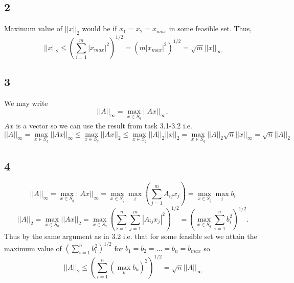 \documentclass{article}
\begin{document}
\subsection*{2}
Maximum value of $||x||_2$ would be if $x_1 = x_2 = x_{max}$ in some feasible set. Thus,
\begin{equation}
    ||x||_2 \leq \left( \sum_{i=1}^m |x_{max}|^2 
                 \right)^{1/2} =
                 \left( m |x_{max}|^2 
                 \right)^{1/2} = 
                 \sqrt{m} ||x||_\infty
\end{equation}
\subsection*{3}
We may write
\begin{equation}
    ||A||_\infty = \max_{x \in S_q} ||Ax||_\infty, 
\end{equation}
$Ax$ is a vector so we can use the result from task 3.1-3.2 i.e.
\begin{equation}
     ||A||_\infty = 
     \max_{x \in S_q} ||Ax||_\infty \leq
      \max_{x \in S_q} ||Ax||_2 \leq  \max_{x \in S_q} ||A||_2 ||x||_2
      =  \max_{x \in S_q} ||A||_2 \sqrt{n} ||x||_\infty = \sqrt{n} ||A||_2 
\end{equation}
\subsection*{4}
\begin{equation}
    ||A||_\infty = \max_{x \in S_q} ||Ax||_\infty = 
    \max_{x \in S_q} \max_i \left( \sum_{j=1}^m A_{ij} x_j \right) = 
    \max_{x \in S_q} \max_i b_i
\end{equation}
\begin{equation}
    ||A||_2 = \max_{x \in S_q} ||Ax||_2
    = \max_{x \in S_q} \left( \sum_{i=1}^n \sum_{j=1}^m |A_{ij} x_j|^2 \right)^{1/2} = 
    \left( \max_{x \in S_q}  \sum_{i=1}^n b_i^2 \right)^{1/2}.
\end{equation}
Thus by the same argument as in 3.2 i.e. that for some feasible set we attain the maximum value of $ ( \sum_{i=1}^n b_i^2)^{1/2} $ for $b_1 = b_2 = ... =b_n = b_{max}$ so
\begin{equation}
    ||A||_2 \leq \left( \sum_{i=1}^n (\max_k b_k) ^2 \right)^{1/2} =
    \sqrt{n} ||A||_\infty
\end{equation}
\end{document}
